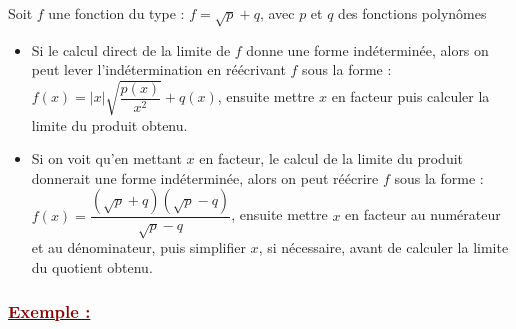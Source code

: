 \documentclass[12pt,a4paper]{article}
\begin{document}
Soit $f$ une fonction du type : $f = \sqrt{p} + q$, avec $p$ et $q$ des fonctions polynômes
\begin{itemize}
    \item Si le calcul direct de la limite de $f$ donne une forme indéterminée, alors on peut lever l'indétermination en réécrivant $f$ sous la forme : $f(x) = |x|\sqrt{\dfrac{p(x)}{x^2}} + q(x)$, ensuite mettre $x$ en facteur puis calculer la limite du produit obtenu.
    \item Si on voit qu'en mettant $x$ en facteur, le calcul de la limite du produit donnerait une forme indéterminée, alors on peut réécrire $f$ sous la forme :\\
    $f(x) = \dfrac{(\sqrt{p} + q)(\sqrt{p} - q)}{\sqrt{p} - q}$, ensuite mettre $x$ en facteur au numérateur et au dénominateur, puis simplifier $x$, si nécessaire, avant de calculer la limite du quotient obtenu.
\end{itemize}

\subsubsection*{\underline{\textcolor{darkred}{ Exemple : }}}
\end{document}

